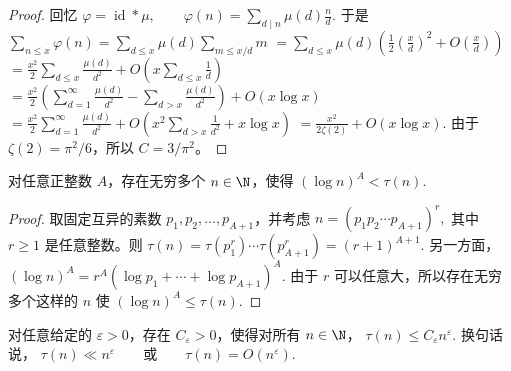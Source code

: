 \begin{proof}
	回忆
	\(\textstyle \varphi=\allowbreak{}\operatorname{id}*\mu,\allowbreak{} \qquad \varphi(n)=\allowbreak{}\sum_{d\mid\allowbreak{} n}\mu(d)\frac nd.\)
	于是
	\(\textstyle \sum_{n\leq\allowbreak{} x}\varphi(n) =\allowbreak{} \sum_{d\leq\allowbreak{} x}\mu(d)\sum_{m\leq\allowbreak{} x/d}m\) \(\textstyle =\allowbreak{} \sum_{d\leq\allowbreak{} x}\mu(d) \left(\frac12\left(\frac xd\right)^2+\allowbreak{}O\left(\frac xd\right)\right)\) \(\textstyle =\allowbreak{} \frac{x^2}{2}\sum_{d\leq\allowbreak{} x}\frac{\mu(d)}{d^2} +\allowbreak{} O\left(x\sum_{d\leq\allowbreak{} x}\frac1d\right)\) \(\textstyle =\allowbreak{} \frac{x^2}{2} \left(\sum_{d=\allowbreak{}1}^\infty\frac{\mu(d)}{d^2} -\sum_{d>x}\frac{\mu(d)}{d^2}\right) +\allowbreak{}O(x\log x)\) \(\textstyle =\allowbreak{} \frac{x^2}{2}\sum_{d=\allowbreak{}1}^\infty\frac{\mu(d)}{d^2} +\allowbreak{}O\left(x^2\sum_{d>x}\frac1{d^2}+\allowbreak{}x\log x\right)\) \(\textstyle =\allowbreak{} \frac{x^2}{2\zeta(2)}+\allowbreak{}O(x\log x).\)
	由于 $\zeta(2)=\pi^2/6$，所以 $C=3/\pi^2$。
\end{proof}







\begin{proposition}[原文 Proposition 1]
	对任意正整数 $A$，存在无穷多个 $n\in\N$，使得
	\(\textstyle (\log n)^A<\tau(n).\)
\end{proposition}

\begin{proof}
	取固定互异的素数 $p_1,p_2,\ldots,p_{A+1}$，并考虑
	\(\textstyle n=\allowbreak{}(p_1p_2\cdots p_{A+\allowbreak{}1})^r,\allowbreak{}\)
	其中 $r\geq 1$ 是任意整数。则
	\(\textstyle \tau(n) =\allowbreak{} \tau(p_1^r)\cdots \tau(p_{A+\allowbreak{}1}^r) =\allowbreak{} (r+\allowbreak{}1)^{A+\allowbreak{}1}.\)
	另一方面，
	\(\textstyle (\log n)^A =\allowbreak{} r^A(\log p_1+\allowbreak{}\cdots+\allowbreak{}\log p_{A+\allowbreak{}1})^A.\)
	由于 $r$ 可以任意大，所以存在无穷多个这样的 $n$ 使
	\(\textstyle (\log n)^A\leq\allowbreak{} \tau(n).\)
\end{proof}

\begin{proposition}[原文 Proposition 2]
	对任意给定的 $\varepsilon>0$，存在 $C_\varepsilon>0$，使得对所有 $n\in\N$，
	\(\textstyle \tau(n)\leq\allowbreak{} C_\varepsilon n^\varepsilon.\)
	换句话说，
	\(\textstyle \tau(n)\ll\allowbreak{} n^\varepsilon \qquad\text{或}\qquad \tau(n)=\allowbreak{}O(n^\varepsilon).\)
\end{proposition}


